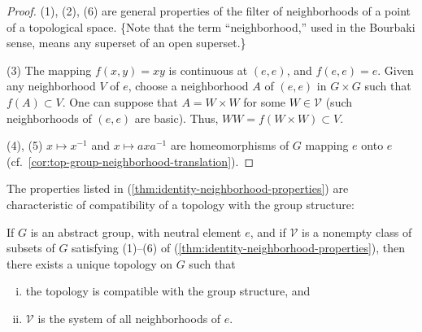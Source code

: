 \begin{proof}
    (1), (2), (6) are general properties of the filter of neighborhoods of a point of a topological space.
    \{Note that the term “neighborhood,” used in the Bourbaki sense, means any superset of an open superset.\}

    (3) The mapping \( f(x, y) = xy \) is continuous at \( (e, e) \), and \( f(e, e) = e \).
    Given any neighborhood \( V \) of \( e \), choose a neighborhood \( A \) of \( (e, e) \) in \( G \times G \) such that \( f(A) \subset V \).
    One can suppose that \( A = W \times W \) for some \( W \in \mathcal{V} \) (such neighborhoods of \( (e, e) \) are basic).
    Thus, \( WW = f(W \times W) \subset V \).

    (4), (5) \( x \mapsto x^{-1} \) and \( x \mapsto axa^{-1} \) are homeomorphisms of \( G \) mapping \( e \) onto \( e \) (cf.\ \ref{cor:top-group-neighborhood-translation}).
\end{proof}


The properties listed in (\ref{thm:identity-neighborhood-properties}) are characteristic of compatibility of a topology with the group structure:


\begin{theorem}
    \label{thm:topology-from-neighborhood-system}

    If \( G \) is an abstract group, with neutral element \( e \), and if \( \mathcal{V} \) is a nonempty class of subsets of \( G \) satisfying \textup{(1)}–\textup{(6)} of \textup{(\ref{thm:identity-neighborhood-properties})}, then there exists a unique topology on \( G \) such that
    \begin{enumerate}[(i)]
        \item the topology is compatible with the group structure, and
        \item \( \mathcal{V} \) is the system of all neighborhoods of \( e \).
    \end{enumerate}
\end{theorem}

